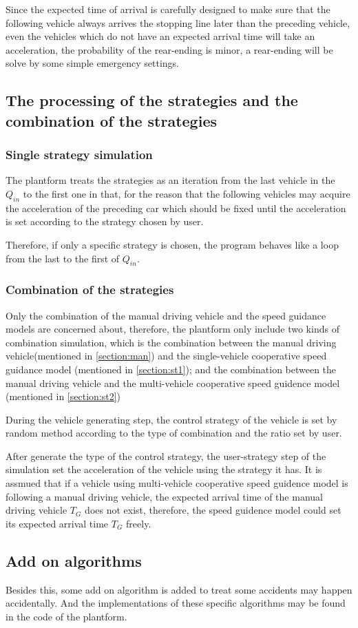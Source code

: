 \documentclass[a4paper,UTF8]{paper}
\begin{document}
Since the expected time of arrival is carefully designed to make sure that the following vehicle always arrives the stopping line later than the preceding vehicle, even the vehicles which do not have an expected arrival time will take an acceleration, the probability of the rear-ending is minor, a rear-ending will be solve by some simple emergency settings. 
\subsection{The processing of the strategies and the combination of the strategies}
\subsubsection{Single strategy simulation}
The plantform treats the strategies as an iteration from the last vehicle in the $Q_{in}$ to the first one in that, for the reason that the following vehicles may acquire the acceleration of the preceding car which should be fixed until the acceleration is set according to the strategy chosen by user. 

Therefore, if only a specific strategy is chosen, the program behaves like a loop from the last to the first of $Q_{in}$.

\subsubsection{Combination of the strategies}
Only the combination of the manual driving vehicle and the speed guidance models are concerned about, therefore, the plantform only include two kinds of combination simulation, which is the combination between the manual driving vehicle(mentioned in \ref{section:man}) and the single-vehicle cooperative speed guidance model (mentioned in \ref{section:st1}); and the combination between the manual driving vehicle and the multi-vehicle cooperative speed guidence model (mentioned in \ref{section:st2})

During the vehicle generating step, the control strategy of the vehicle is set by random method according to the type of combination and the ratio set by user.

After generate the type of the control strategy, the user-strategy step of the simulation set the acceleration of the vehicle using the strategy it has. It is assmued that if a vehicle using multi-vehicle cooperative speed guidence model is following a manual driving vehicle, the expected arrival time of the manual driving vehicle $T_G$ does not exist, therefore, the speed guidence model could set its expected arrival time $T_G$ freely.

\subsection{Add on algorithms}
Besides this, some add on algorithm is added to treat some accidents may happen accidentally. And the implementations of these specific algorithms may be found in the code of the plantform.
\end{document}
